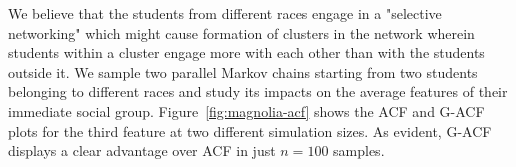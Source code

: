 \documentclass[11pt]{article}
\theoremstyle{remark}
\begin{document}







We believe that the students from different races engage in a "selective networking" which might cause formation of clusters in the network wherein students within a cluster engage more with each other than with the students outside it. We sample two parallel Markov chains starting from two students belonging to different races and study its impacts on the average features of their immediate social group. Figure~\ref{fig:magnolia-acf} shows the ACF and G-ACF plots for the third feature at two different simulation sizes. As evident, G-ACF displays a clear advantage over ACF in just $n=100$ samples.



\singlespacing


\end{document}
